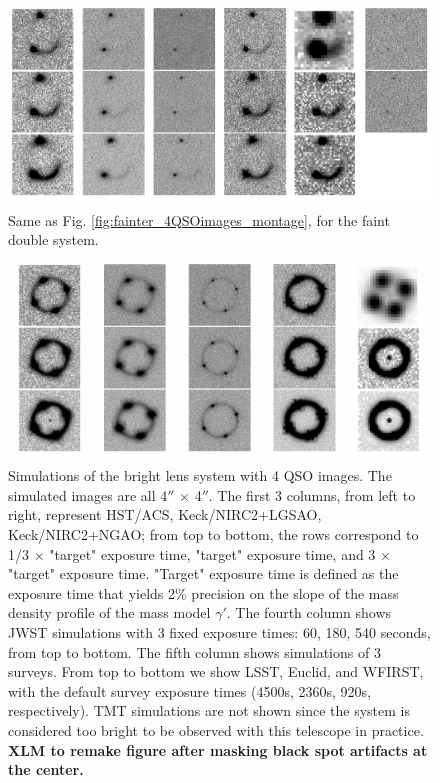 \documentclass[a4paper,11pt]{article}
\begin{document}
\begin{figure}
\begin{center}
\includegraphics[width=1.0\textwidth]{figures/fainter_system_2QSOimages_all.png}
\end{center}
\caption{Same as Fig. \ref{fig:fainter_4QSOimages_montage}, for the faint double system.}
\label{fig:fainter_2QSOimages_montage}
\end{figure}

\begin{figure}
\begin{center}
\includegraphics[width=1.0\textwidth]{figures/brighter_system_4QSOimages_all.png}
\end{center}
\caption{Simulations of the bright lens system with 4 QSO images. The simulated images are all 4$''$ $\times$ 4$''$. The first 3 columns, from left to right, represent HST/ACS, Keck/NIRC2+LGSAO, Keck/NIRC2+NGAO; from top to bottom, the rows correspond to 1/3 $\times$ "target" exposure time, "target" exposure time, and 3 $\times$ "target" exposure time. "Target" exposure time is defined as the exposure time that yields 2\% precision on the slope of the mass density profile of the mass model $\gamma'$. The fourth column shows JWST simulations with 3 fixed exposure times: 60, 180, 540 seconds, from top to bottom. The fifth column 
shows simulations of 3 surveys. From top to bottom we show LSST, Euclid, and WFIRST, with the default survey exposure times (4500s, 2360s, 920s, respectively). TMT simulations are not shown since the system is considered too bright to be observed with this telescope in practice. \bf {XLM to remake figure after masking black spot artifacts at the center.}}
\label{fig:brighter_4QSOimages_montage}
\end{figure}
\end{document}
